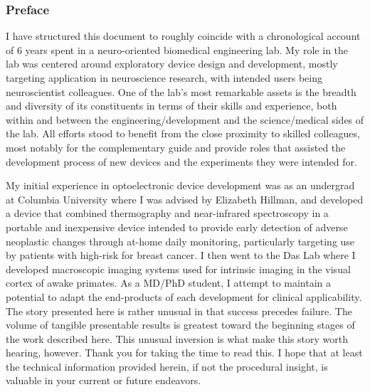 \hypertarget{preface}{%
\subsubsection*{Preface}\label{preface}}

I have structured this document to roughly coincide with a chronological account of 6 years spent in a neuro-oriented biomedical engineering lab.
My role in the lab was centered around exploratory device design and development, mostly targeting application in neuroscience research, with intended users being neuroscientist colleagues.
One of the lab's most remarkable assets is the breadth and diversity of its constituents in terms of their skills and experience, both within and between the engineering/development and the science/medical sides of the lab.
All efforts stood to benefit from the close proximity to skilled colleagues, most notably for the complementary guide and provide roles that assisted the development process of new devices and the experiments they were intended for.

My initial experience in optoelectronic device development was as an undergrad at Columbia University where I was advised by Elizabeth Hillman, and developed a device that combined thermography and near-infrared spectroscopy in a portable and inexpensive device intended to provide early detection of adverse neoplastic changes through at-home daily monitoring, particularly targeting use by patients with high-risk for breast cancer.
I then went to the Das Lab where I developed macroscopic imaging systems used for intrinsic imaging in the visual cortex of awake primates.
As a MD/PhD student, I attempt to maintain a potential to adapt the end-products of each development for clinical applicability.
The story presented here is rather unusual in that success precedes failure.
The volume of tangible presentable results is greatest toward the beginning stages of the work described here.
This unusual inversion is what make this story worth hearing, however.
Thank you for taking the time to read this.
I hope that at least the technical information provided herein, if not the procedural insight, is valuable in your current or future endeavors.
